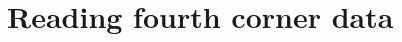 \documentclass{article}
\newcommand{\R}{{\sf R}}
\newcommand{\code}[1]{\texttt{#1}}
\numberwithin{exercise}{section}
\begin{document}

\newpage

\section{Reading fourth corner data}
\end{document}

